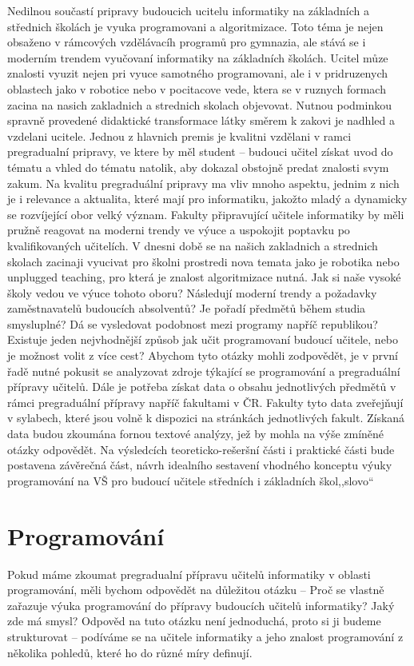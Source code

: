 \documentclass[FP,DP]{tulthesis}
\begin{document}
Nedilnou součastí pripravy budoucich ucitelu informatiky na základních a střednich školách  je vyuka programovani a algoritmizace. Toto téma je nejen obsaženo v rámcových vzdělávacíh programů pro gymnazia, ale stává se i moderním trendem vyučovaní informatiky na základních školách. Ucitel můze znalosti vyuzit nejen pri vyuce samotného programovani, ale i v pridruzenych oblastech jako v robotice nebo v pocitacove vede, ktera se v ruznych formach zacina na nasich zakladnich a strednich skolach objevovat. Nutnou podminkou spravně provedené didaktické transformace látky směrem  k zakovi je nadhled a vzdelani ucitele. Jednou z hlavnich premis je kvalitni vzdělani v ramci pregradualní pripravy, ve ktere by měl student – budouci učitel získat uvod do tématu a vhled do tématu natolik, aby dokazal obstojně predat znalosti svym zakum. Na kvalitu pregraduální pripravy ma vliv mnoho aspektu, jednim z nich je i relevance a aktualita, které mají pro informatiku, jakožto mladý a dynamicky se rozvíjející obor velký význam. Fakulty připravující učitele informatiky by měli pružně reagovat na moderni trendy ve výuce a uspokojit poptavku po kvalifikovaných učitelích.  V dnesni době se na našich zakladnich a strednich skolach zacinaji vyucivat pro školni prostredi nova temata jako je robotika nebo unplugged teaching, pro která je znalost algoritmizace nutná. Jak si naše vysoké školy vedou ve výuce tohoto oboru? Následují moderní trendy a požadavky zaměstnavatelů budoucích absolventů? Je pořadí předmětů během studia smysluplné? Dá se vysledovat podobnost mezi programy napříč republikou? Existuje  jeden nejvhodnější způsob jak učit programovaní budoucí učitele, nebo je možnost volit z více cest? Abychom tyto otázky mohli zodpovědět, je v první řadě nutné pokusit se analyzovat zdroje týkající se programování a pregraduální přípravy učitelů. Dále je potřeba získat data o obsahu jednotlivých předmětů v rámci pregraduální přípravy napříč fakultami v ČR. Fakulty tyto data zveřejňují v sylabech, které jsou volně k dispozici na stránkách jednotlivých fakult. Získaná data budou zkoumána fornou textové analýzy, jež by mohla na výše zmíněné otázky odpovědět. Na výsledcích teoreticko-rešeršní části i praktické části bude postavena závěrečná část, návrh idealního sestavení vhodného konceptu výuky programování na VŠ pro budoucí učitele středních i základních škol,,slovo{}``

\listoftodos
\chapter{Programování}
Pokud máme zkoumat pregradualní přípravu učitelů informatiky v oblasti programování, měli bychom odpovědět na důležitou otázku -- Proč se vlastně zařazuje výuka programování do přípravy budoucích učitelů informatiky? Jaký zde má smysl? Odpověd na tuto otázku není jednoduchá, proto si ji budeme strukturovat -- podíváme se na učitele informatiky a jeho znalost programování z několika pohledů, které ho do různé míry definují. 
\end{document}
